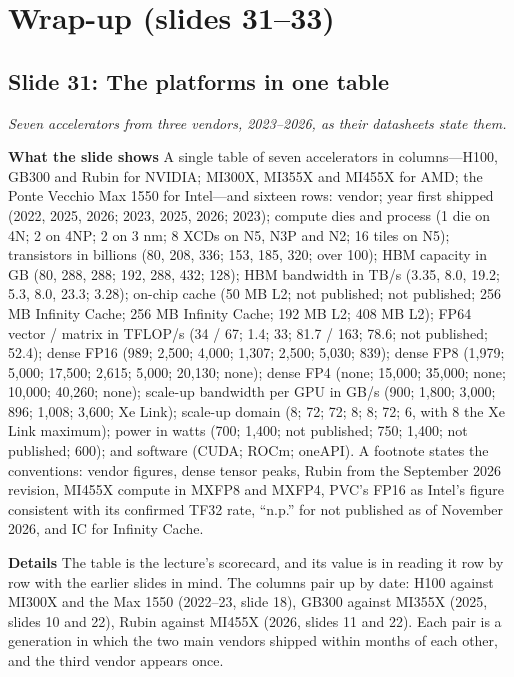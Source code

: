 \documentclass[11pt,letterpaper]{article}
\newcommand{\slide}[3]{%
  \subsection[Slide #1: #2]{Slide #1: #2}%
  {\color{muted}\itshape #3\par}\medskip}
\newcommand{\para}[1]{\medskip\noindent\textbf{#1}\quad}
\begin{document}
\section{Wrap-up (slides 31--33)}

\slide{31}{The platforms in one table}{Seven accelerators from three vendors, 2023--2026, as their datasheets state them.}

\para{What the slide shows} A single table of seven accelerators in columns---H100, GB300 and Rubin for NVIDIA; MI300X, MI355X and MI455X for AMD; the Ponte Vecchio Max 1550 for Intel---and sixteen rows: vendor; year first shipped (2022, 2025, 2026; 2023, 2025, 2026; 2023); compute dies and process (1 die on 4N; 2 on 4NP; 2 on 3 nm; 8 XCDs on N5, N3P and N2; 16 tiles on N5); transistors in billions (80, 208, 336; 153, 185, 320; over 100); HBM capacity in GB (80, 288, 288; 192, 288, 432; 128); HBM bandwidth in TB/s (3.35, 8.0, 19.2; 5.3, 8.0, 23.3; 3.28); on-chip cache (50 MB L2; not published; not published; 256 MB Infinity Cache; 256 MB Infinity Cache; 192 MB L2; 408 MB L2); FP64 vector / matrix in TFLOP/s (34 / 67; 1.4; 33; 81.7 / 163; 78.6; not published; 52.4); dense FP16 (989; 2,500; 4,000; 1,307; 2,500; 5,030; 839); dense FP8 (1,979; 5,000; 17,500; 2,615; 5,000; 20,130; none); dense FP4 (none; 15,000; 35,000; none; 10,000; 40,260; none); scale-up bandwidth per GPU in GB/s (900; 1,800; 3,000; 896; 1,008; 3,600; Xe Link); scale-up domain (8; 72; 72; 8; 8; 72; 6, with 8 the Xe Link maximum); power in watts (700; 1,400; not published; 750; 1,400; not published; 600); and software (CUDA; ROCm; oneAPI). A footnote states the conventions: vendor figures, dense tensor peaks, Rubin from the September 2026 revision, MI455X compute in MXFP8 and MXFP4, PVC's FP16 as Intel's figure consistent with its confirmed TF32 rate, ``n.p.'' for not published as of November 2026, and IC for Infinity Cache.

\para{Details} The table is the lecture's scorecard, and its value is in reading it row by row with the earlier slides in mind. The columns pair up by date: H100 against MI300X and the Max 1550 (2022--23, slide 18), GB300 against MI355X (2025, slides 10 and 22), Rubin against MI455X (2026, slides 11 and 22). Each pair is a generation in which the two main vendors shipped within months of each other, and the third vendor appears once.
\end{document}
